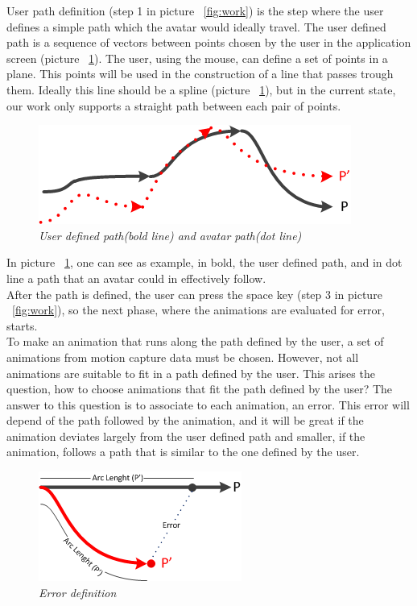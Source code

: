 \documentclass[a4paper]{article}
\begin{document}
User path definition (step 1 in picture ~\ref{fig:work}) is the step where the user defines a simple path which the avatar would ideally travel.   The user defined path is a sequence of vectors between points chosen by the user in the application screen (picture ~\ref{fig:uapath}). The user, using the mouse, can define a set of points in a plane. This points will be used in the construction of a line that passes trough them. Ideally this line should be a spline (picture ~\ref{fig:uapath}), but in the current state, our work only supports a straight path between each pair of points. 
\\
\begin{figure}[hbtp]
\begin{center}
\includegraphics[scale=0.8]{Images/UserPathVSAvatarPath.png} 
\caption{\textit{User defined path(bold line) and avatar path(dot line)}}
\label{fig:uapath}
\end{center}
\end{figure}

In picture ~\ref{fig:uapath}, one can see as example, in bold, the user defined path, and in dot line a path that an avatar could in effectively follow.  
\\

After the path is defined, the user can press the space key (step 3 in picture ~\ref{fig:work}), so the next phase, where the animations are evaluated for error, starts.
\\

To make an animation that runs along the path defined by the user, a set of animations from motion capture data must be chosen.  However, not all animations are suitable to fit in a path defined by the user. This arises the question, how to choose animations that fit the path defined by the user? The answer to this question is to associate to each animation, an error. This error will depend of the path followed by the animation, and it will be great if the animation deviates largely from the user defined path and smaller, if the animation, follows a path that is similar to the one defined by the user. 
\\
\begin{figure}[hbtp]
\begin{center}
\includegraphics[scale=0.8]{Images/error.png} 
\caption{\textit{Error definition}}
\label{fig:error}
\end{center}
\end{figure}
\end{document}
